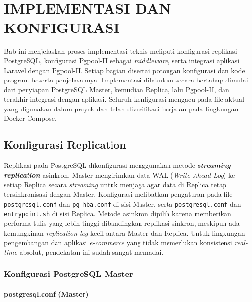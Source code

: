 \chapter{IMPLEMENTASI DAN KONFIGURASI}

Bab ini menjelaskan proses implementasi teknis meliputi konfigurasi
replikasi PostgreSQL, konfigurasi Pgpool-II sebagai
\textit{middleware}, serta integrasi aplikasi Laravel dengan
Pgpool-II. Setiap bagian disertai potongan konfigurasi dan kode
program beserta penjelasannya. Implementasi dilakukan secara bertahap
dimulai dari penyiapan PostgreSQL Master, kemudian Replica, lalu
Pgpool-II, dan terakhir integrasi dengan aplikasi. Seluruh konfigurasi
mengacu pada file aktual yang digunakan dalam proyek dan telah
diverifikasi berjalan pada lingkungan Docker Compose.

\section{Konfigurasi Replication}

Replikasi pada PostgreSQL dikonfigurasi menggunakan metode
\textbf{\textit{streaming replication}} asinkron. Master mengirimkan
data WAL (\textit{Write-Ahead Log}) ke setiap Replica secara
\textit{streaming} untuk menjaga agar data di Replica tetap
tersinkronisasi dengan Master. Konfigurasi melibatkan pengaturan pada
file \texttt{postgresql.conf} dan \texttt{pg\_hba.conf} di sisi
Master, serta \texttt{postgresql.conf} dan \texttt{entrypoint.sh} di
sisi Replica. Metode asinkron dipilih karena memberikan performa tulis
yang lebih tinggi dibandingkan replikasi sinkron, meskipun ada
kemungkinan \textit{replication lag} kecil antara Master dan Replica.
Untuk lingkungan pengembangan dan aplikasi \textit{e-commerce} yang
tidak memerlukan konsistensi \textit{real-time} absolut, pendekatan
ini sudah sangat memadai.

\subsection{Konfigurasi PostgreSQL Master}

\subsubsection{postgresql.conf (Master)}

